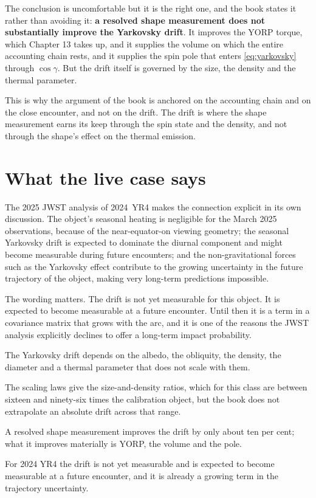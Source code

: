 The conclusion is uncomfortable but it is the right one, and the book states
it rather than avoiding it: \textbf{a resolved shape measurement does not
substantially improve the Yarkovsky drift}. It improves the YORP torque,
which Chapter 13 takes up, and it supplies the volume on which the entire
accounting chain rests, and it supplies the spin pole that enters
\eqref{eq:yarkovsky} through \(\cos\gamma\). But the drift itself is
governed by the size, the density and the thermal parameter.

This is why the argument of the book is anchored on the accounting chain and
on the close encounter, and not on the drift. The drift is where the shape
measurement earns its keep through the spin state and the density, and not
through the shape's effect on the thermal emission.

\section{What the live case says}

The 2025 JWST analysis of 2024~YR4 makes the connection explicit in its own
discussion. The object's seasonal heating is negligible for the March 2025
observations, because of the near-equator-on viewing geometry; the seasonal
Yarkovsky drift is expected to dominate the diurnal component and might
become measurable during future encounters; and the non-gravitational forces
such as the Yarkovsky effect contribute to the growing uncertainty in the
future trajectory of the object, making very long-term predictions
impossible.

The wording matters. The drift is not yet measurable for this object. It is
expected to become measurable at a future encounter. Until then it is a
term in a covariance matrix that grows with the arc, and it is one of the
reasons the JWST analysis explicitly declines to offer a long-term impact
probability.

\begin{keytakeaways}
\item The Yarkovsky drift depends on the albedo, the obliquity, the density,
the diameter and a thermal parameter that does not scale with them.
\item The scaling laws give the size-and-density ratios, which for this class
are between sixteen and ninety-six times the calibration object, but the
book does not extrapolate an absolute drift across that range.
\item A resolved shape measurement improves the drift by only about ten per
cent; what it improves materially is YORP, the volume and the pole.
\item For 2024 YR4 the drift is not yet measurable and is expected to become
measurable at a future encounter, and it is already a growing term in the
trajectory uncertainty.
\end{keytakeaways}
